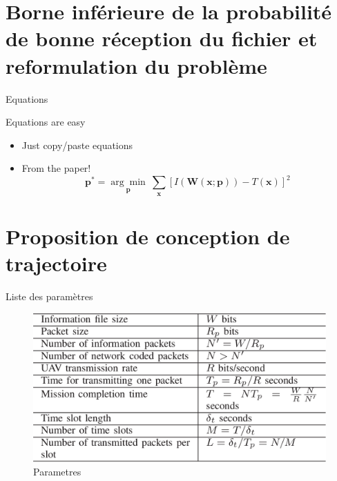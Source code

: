 \documentclass[utf8, a4paper]{beamer}
\begin{document}
\section{Borne inférieure de la probabilité de bonne réception du fichier et reformulation du problème}



\begin{frame}{Equations}

  Equations are easy
  \begin{itemize}
  \item Just copy/paste equations\pause
  \item From the paper!
    \begin{equation*}
      \textbf{p}^* = \underset{\textbf{p}}{\arg\!\min}~\sum_{\textbf{x}}\left[ I(\textbf{W}(\textbf{x};\textbf{p})) - T(\textbf{x}) \right]^2
    \end{equation*}
  \end{itemize}
\end{frame}

\section{Proposition de conception de trajectoire}


\begin{frame}{Liste des paramètres}

  \begin{figure}[t]
    \centering
    \includegraphics[height=\dimexpr11\textheight/16\relax]{param}
    \caption{Parametres}
  \end{figure}
\end{frame}
\end{document}
